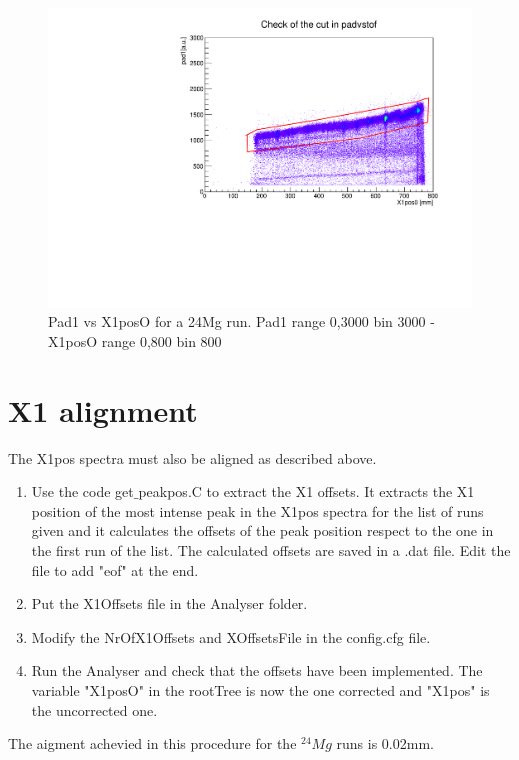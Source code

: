 \documentclass[]{report}
\begin{document}
\begin{figure}
	\includegraphics[width=\linewidth]{Figure/run2322-24Mg-pad1vsX1posO.pdf}
	\caption{Pad1 vs X1posO for a 24Mg run. Pad1 range 0,3000 bin 3000 - X1posO range 0,800 bin 800}
	\label{fig:pad1vsX1}
\end{figure}


\section{X1 alignment}

The X1pos spectra must also be aligned as described above.
\begin{enumerate}
	\item Use the code get$\_$peakpos.C to extract the X1 offsets. It extracts the X1 position of the most intense peak in the X1pos spectra for the list of runs given and it calculates the offsets of the peak position respect to the one in the first run of the list. The calculated offsets are saved in a .dat file. Edit the file to add "eof" at the end.
	\item Put the X1Offsets file in the Analyser folder.
	\item Modify the NrOfX1Offsets and XOffsetsFile in the config.cfg file.
	\item Run the Analyser and check that the offsets have been implemented. The variable "X1posO" in the rootTree is now the one corrected and "X1pos" is the uncorrected one.
\end{enumerate}

The aigment achevied in this procedure for the $^{24}Mg$ runs is 0.02mm.\\
\end{document}

